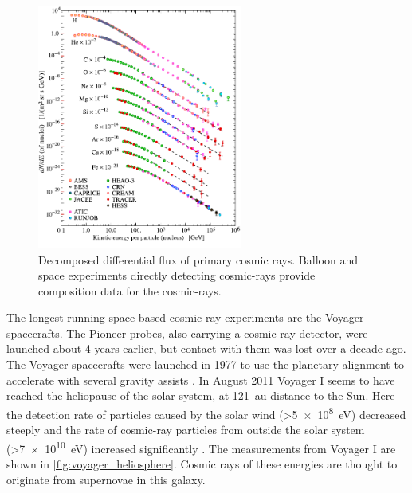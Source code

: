 \begin{figure}
    \centering
    \includegraphics[width=0.6\textwidth]
                    {plots/cosmic-rays/PDG_28_1_fluxes_per_nucleus.pdf}
    \caption{Decomposed differential flux of primary cosmic rays. Balloon and space experiments directly detecting cosmic-rays provide composition data for the cosmic-rays.}
    \label{fig:PDG_28_1_fluxes_per_nucleus}
\end{figure}

The longest running space-based cosmic-ray experiments are the Voyager spacecrafts. The Pioneer probes, also carrying a cosmic-ray detector, were launched about 4 years earlier, but contact with them was lost over a decade ago. The Voyager spacecrafts were launched in 1977 to use the planetary alignment to accelerate with several gravity assists \cite{stone1977voyager}. In August 2011 Voyager I seems to have reached the heliopause of the solar system, at \SI{121}{\astronomicalunit} distance to the Sun. Here the detection rate of particles caused by the solar wind (>\SI{5e8}{\eV}) decreased steeply and the rate of cosmic-ray particles from outside the solar system (>\SI{7e10}{\eV}) increased significantly \cite{stone2013voyager}. The measurements from Voyager I are shown in \cref{fig:voyager_heliosphere}. Cosmic rays of these energies are thought to originate from supernovae in this galaxy.

